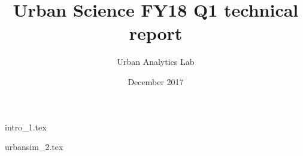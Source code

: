 \documentclass[onecolumn,10pt]{IEEEtran}
\title{Urban Science FY18 Q1 technical report}
\author{Urban Analytics Lab}
\date{December 2017}
\begin{document}
\maketitle
\begin{abstract}

\end{abstract}

{intro_1.tex}

{urbansim_2.tex}




\end{document}
